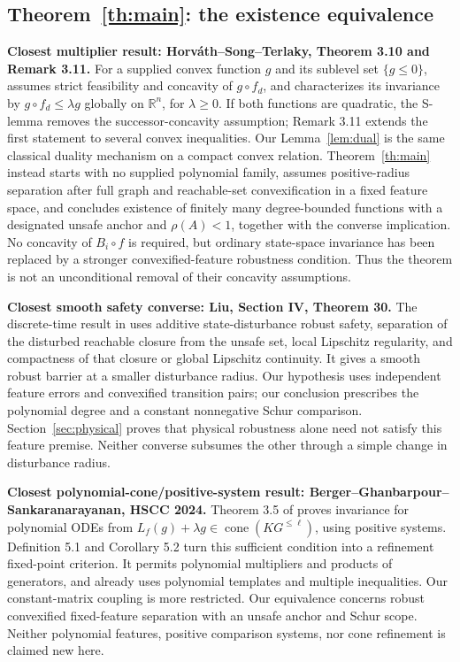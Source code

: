 \documentclass[journal,10pt]{IEEEtran}
\theoremstyle{definition}\newtheorem{definition}{Definition}
\theoremstyle{remark}
\newcommand{\R}{\mathbb R}
\begin{document}
\subsection{Theorem~\ref{th:main}: the existence equivalence}
\textbf{Closest multiplier result: Horv\'ath--Song--Terlaky, Theorem 3.10 and Remark 3.11.}
For a supplied convex function $g$ and its sublevel set $\{g\leq0\}$, \cite{hst} assumes
strict feasibility and concavity of $g\circ f_d$, and characterizes its
invariance by $g\circ f_d\leq\lambda g$ globally on $\R^n$, for
$\lambda\geq0$. If both functions are quadratic, the S-lemma removes the
successor-concavity assumption; Remark 3.11 extends the first statement
to several convex inequalities.
Our Lemma~\ref{lem:dual} is the same classical duality mechanism on a compact
convex relation. Theorem~\ref{th:main} instead starts with no supplied
polynomial family, assumes positive-radius separation after full graph and
reachable-set convexification in a fixed feature space, and concludes existence
of finitely many degree-bounded functions with a designated unsafe anchor and
$\rho(A)<1$, together with the converse implication.
No concavity of $B_i\circ f$ is required, but ordinary state-space invariance
has been replaced by a stronger convexified-feature robustness condition.
Thus the theorem is not an unconditional removal of their concavity assumptions.

\textbf{Closest smooth safety converse: Liu, Section IV, Theorem 30.}
The discrete-time result in \cite{liu} uses additive state-disturbance robust
safety, separation of the disturbed reachable closure from the unsafe set,
local Lipschitz regularity, and compactness of that closure or global
Lipschitz continuity. It gives a smooth robust barrier at a smaller disturbance
radius. Our hypothesis uses independent feature errors and convexified
transition pairs; our conclusion prescribes the polynomial degree and a
constant nonnegative Schur comparison. Section~\ref{sec:physical} proves
that physical robustness alone need not satisfy this feature premise.
Neither converse subsumes the other through a simple change in disturbance radius.

\textbf{Closest polynomial-cone/positive-system result: Berger--Ghanbarpour--Sankaranarayanan, HSCC 2024.}
Theorem 3.5 of \cite{cone2024} proves invariance for polynomial ODEs from
$L_f(g)+\lambda g\in\operatorname{cone}(K G^{\leq\ell})$, using positive
systems. Definition 5.1 and Corollary 5.2 turn this sufficient condition into
a refinement fixed-point criterion. It permits polynomial multipliers and
products of generators, and already uses polynomial templates and multiple
inequalities. Our constant-matrix coupling is more restricted. Our equivalence concerns
robust convexified fixed-feature separation with an unsafe anchor and Schur scope.
Neither polynomial features, positive comparison systems, nor cone refinement
is claimed new here.
\end{document}
